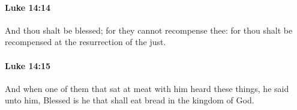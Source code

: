 		\paragraph{Luke 14:14} %
			\label{LUKE-14-14}

			And thou shalt be blessed; for they cannot recompense thee: for thou shalt be recompensed at the resurrection of the just.

			\begin{framed}
			\scriptsize
				\begin{compactdesc}
					\item[SBLG]  \hyperref[DIKAIOS]{}
				\end{compactdesc}
			\end{framed}

		\paragraph{Luke 14:15} %
			\label{LUKE-14-15}

			And when one of them that sat at meat with him heard these things, he said unto him, Blessed is he that shall eat bread in the kingdom of God.

